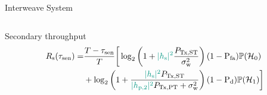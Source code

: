 \documentclass[16pt]{beamer}
\begin{document}
\begin{frame}[t]{Interweave System}
\begin{columns}
\begin{column}{0.56\columnwidth}
{\begin{block}{\scriptsize Secondary throughput}
                                \vspace{-2.6mm}
				\begin{align*}
                               		\rs(\tsen) =& \frac{T- \tsen}{T} \bigg[ \log_2 \left(1 + {\color{kit-green100}{|\hs|^2}} \frac{\ptranst}{\npo}\right) (1 - \pfa) \phz  \\ & + \log_2 \left(1 + \frac{{\color{kit-green100}{|\hs|^2}} \ptranst }{{\color{kit-green100}{|\hpt|^2}} \ptranpt  + \npo } \right)  (1 - \pd) \pho  \bigg] 
				\end{align*} 
                \end{block} 	
		}
		\end{column}
	\end{columns}
\end{frame}

\end{document}
